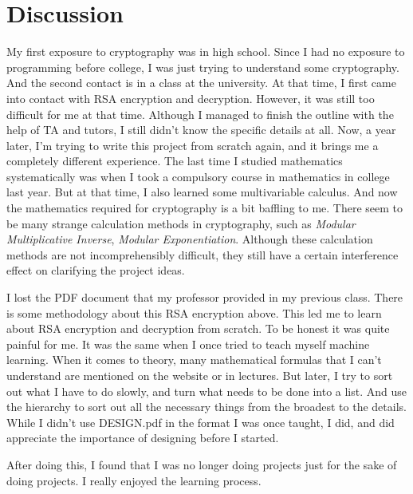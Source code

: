 \documentclass{article}
\begin{document}
\section{Discussion}
    My first exposure to cryptography was in high school. Since I had no exposure to programming before college, I was just trying to understand some cryptography. And the second contact is in a class at the university. At that time, I first came into contact with RSA encryption and decryption. However, it was still too difficult for me at that time. Although I managed to finish the outline with the help of TA and tutors, I still didn't know the specific details at all. Now, a year later, I'm trying to write this project from scratch again, and it brings me a completely different experience. The last time I studied mathematics systematically was when I took a compulsory course in mathematics in college last year. But at that time, I also learned some multivariable calculus. And now the mathematics required for cryptography is a bit baffling to me. There seem to be many strange calculation methods in cryptography, such as \textit{Modular Multiplicative Inverse}, \textit{Modular Exponentiation}. Although these calculation methods are not incomprehensibly difficult, they still have a certain interference effect on clarifying the project ideas.

    I lost the PDF document that my professor provided in my previous class. There is some methodology about this RSA encryption above. This led me to learn about RSA encryption and decryption from scratch. To be honest it was quite painful for me. It was the same when I once tried to teach myself machine learning. When it comes to theory, many mathematical formulas that I can't understand are mentioned on the website or in lectures. But later, I try to sort out what I have to do slowly, and turn what needs to be done into a list. And use the hierarchy to sort out all the necessary things from the broadest to the details. While I didn't use DESIGN.pdf in the format I was once taught, I did, and did appreciate the importance of designing before I started.
    
    After doing this, I found that I was no longer doing projects just for the sake of doing projects. I really enjoyed the learning process.
\end{document}
